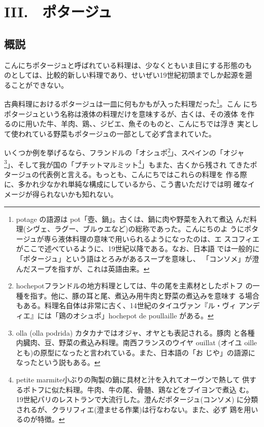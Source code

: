 \href{原稿下準備20180414五島、連載からコピー}{} \href{訳と注釈}{}
\href{未、原文対照チェック}{} \href{未、日本語表現校正}{}
\href{未、その他修正}{} \href{未、原稿最終校正}{}

\hypertarget{potages}{%
\chapter{III.　ポタージュ}\label{potages}}

\hypertarget{considerations-generales-potages}{%
\section{概説}\label{considerations-generales-potages}}


こんにちポタージュと呼ばれている料理は、少なくともいま目にする形態のも
のとしては、比較的新しい料理であり、せいぜい19世紀初頭までしか起源を遡
ることができない。

古典料理におけるポタージュは一皿に何もかもが入った料理だった\footnote{potage
  の語源は pot「壺、鍋」。古くは、鍋に肉や野菜を入れて煮込
  んだ料理(シヴェ、ラグー、ブルゥエなど)の総称であった。こんにちのよ
  うにポタージュが専ら液体料理の意味で用いられるようになったのは、エ
  スコフィエがここで述べているように、19世紀以降である。なお、日本語
  では一般的に「ポタージュ」という語はとろみがあるスープを意味し、
  「コンソメ」が澄んだスープを指すが、これは英語由来。}。こん
にちポタージュという名称は液体の料理だけを意味するが、古くは、その液体
を作るのに用いた牛、羊肉、鶏、、ジビエ、魚そのものと、こんにちでは浮き
実として使われている野菜もポタージュの一部として必ず含まれていた。

いくつか例を挙げるなら、フランドルの「オシュポ\footnote{hochepotフランドルの地方料理としては、牛の尾を主素材としたポトフ
  の一種を指す。他に、豚の耳と尾、煮込み用牛肉と野菜の煮込みを意味す
  る場合もある。料理名自体は非常に古く、14世紀のタイユヴァン『ル・ヴィ
  アンディエ』には「鶏のオシュポ」hochepot de poullaille がある。}」、スペインの「オジャ
\footnote{olla (olla podrida)
  カタカナではオジャ、オヤとも表記される。豚肉
  と各種内臓肉、豆、野菜の煮込み料理。南西フランスのウイヤ ouillat
  (オイユ oilleとも)の原型になったと言われている。また、日本語の「お
  じや」の語源になったという説もある。}」、そして我が国の「プチットマルミット\footnote{petite
  marmite小ぶりの陶製の鍋に具材と汁を入れてオーヴンで熱して
  供するポトフに似た料理。牛肉、牛の尾、骨髄、鶏などをブイヨンで煮込
  む。19世紀パリのレストランで大流行した。澄んだポタージュ(コンソメ)
  に分類されるが、クラリフィエ(澄ませる作業)は行なわない。また、必ず
  鶏を用いるのが特徴。}」もまた、古くから残され
てきたポタージュの代表例と言える。もっとも、こんにちではこれらの料理を
作る際に、多かれ少なかれ単純な構成にしているから、こう書いただけでは明
確なイメージが得られないかも知れない。

